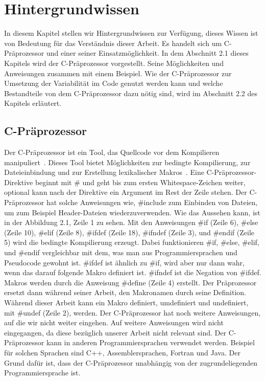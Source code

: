 \chapter{Hintergrundwissen}
In diesem Kapitel stellen wir Hintergrundwissen zur Verfügung, dieses Wissen ist von Bedeutung für das Verständnis dieser Arbeit. Es handelt sich um C-Präprozessor und einer seiner Einsatzmöglichkeit. In dem Abschnitt 2.1 dieses Kapitels wird der C-Präprozessor vorgestellt. Seine Möglichkeiten und Anweisungen zusammen mit einem Beispiel. Wie der C-Präprozessor zur Umsetzung der Variabilität im Code genutzt werden kann und welche Bestandteile von dem C-Präprozessor dazu nötig sind, wird im Abschnitt 2.2 des Kapitels erläutert. \\






\section{C-Präprozessor}
Der C-Präprozessor ist ein Tool, das Quellcode vor dem Kompilieren manipuliert~\cite{ABKS13}. Dieses Tool bietet Möglichkeiten zur bedingte Kompilierung, zur  Dateieinbindung und zur Erstellung lexikalischer Makros~\cite{ABKS13}. Eine C-Präprozessor-Direktive beginnt mit \# und geht bis zum ersten Whitespace-Zeichen weiter, optional kann nach der Direktive ein Argument im Rest der Zeile stehen. Der C-Präprozessor hat solche Anweisungen wie, \#include zum Einbinden von Dateien, um zum Beispiel Header-Dateien wiederzuverwenden. Wie das Aussehen kann, ist in der Abbildung 2.1, Zeile 1 zu sehen. Mit den Anweisungen \#if (Zeile 6), \#else (Zeile 10), \#elif (Zeile 8), \#ifdef (Zeile 18), \#ifndef (Zeile 3), und \#endif (Zeile 5) wird die bedingte Kompilierung erzeugt. Dabei funktionieren \#if, \#else, \#elif, und \#endif vergleichbar mit dem, was man aus Programmiersprachen und Pseudocode gewohnt ist. \#ifdef ist ähnlich zu \#if, wird aber nur dann wahr, wenn das darauf folgende Makro definiert ist. \#ifndef ist die Negation von \#ifdef. Makros werden durch die Anweisung \#define (Zeile 4) erstellt. Der Präprozessor ersetzt dann während seiner Arbeit, den Makronamen durch seine Definition. Während dieser Arbeit kann ein Makro definiert, umdefiniert und undefiniert, mit \#undef (Zeile 2), werden. Der C-Präprozessor hat noch weitere Anweisungen, auf die wir nicht weiter eingehen. Auf weitere Anweisungen wird nicht eingegangen, da diese bezüglich unserer Arbeit nicht relevant sind. Der C-Präprozessor kann in anderen Programmiersprachen verwendet werden. Beispiel für solchen Sprachen sind C++, Assemblersprachen, Fortran und Java. Der Grund dafür ist, dass der C-Präprozessor unabhängig von der zugrundeliegenden Programmiersprache ist.


